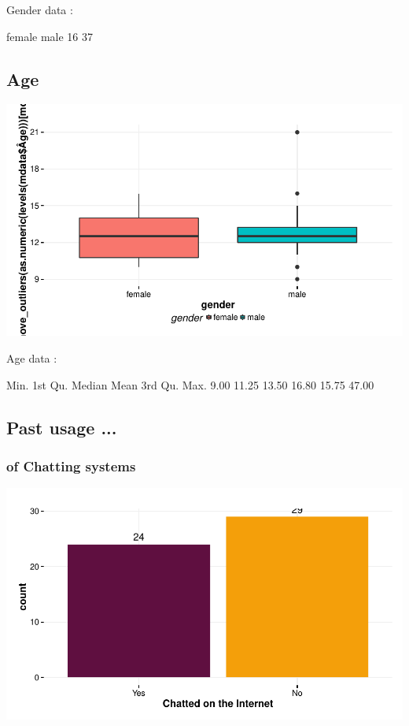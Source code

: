 \documentclass{article}
\begin{document}
Gender data : 
\begin{Schunk}
\begin{Soutput}
female   male 
    16     37 
\end{Soutput}
\end{Schunk}

\subsection{Age}
\includegraphics{Raw_num/plots/-plot_gender_age}

Age data : 
\begin{Schunk}
\begin{Soutput}
   Min. 1st Qu.  Median    Mean 3rd Qu.    Max. 
   9.00   11.25   13.50   16.80   15.75   47.00 
\end{Soutput}
\end{Schunk}

\subsection{Past usage ...}
\subsubsection{of Chatting systems}
\includegraphics{Raw_num/plots/-plot_chat_net}
\end{document}
